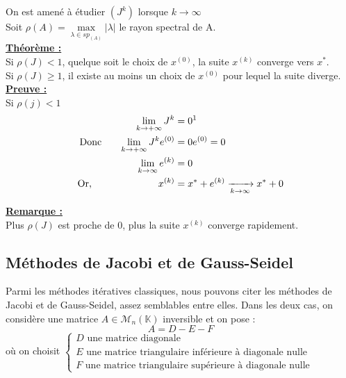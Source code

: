 On est amené à étudier $\left(J^k\right)$ lorsque $k \to \infty$\\

Soit $\rho(A) = \underset{\lambda \in sp_{(A)}}{\max}\left|\lambda\right|$ le rayon spectral de A.\\

\noindent\textbf{\underline{Théorème :}}\\
\indent Si $\rho(J) < 1$, quelque soit le choix de $x^{(0)}$, la suite $x^{(k)}$ converge vers $x^*$.\\
Si $\rho(J) \geq 1$, il existe au moins un choix de $x^{(0)}$ pour lequel la suite diverge.\\

\noindent\textbf{\underline{Preuve :}}\\
\indent Si $\rho(j) < 1$ \\
\begin{align*}
\lim\limits_{k \to +\infty} J^k &= 0 \text{\footnotemark}\\
\text{Donc } \hspace{15pt} \lim\limits_{k \to +\infty} J^ke^{(0)} &= 0e^{(0)} = 0\\
\lim\limits_{k \to \infty} e^{(k)} &= 0\\
\text{Or, } \hspace{65pt} x^{(k)} &= x^* + e^{(k)} \xrightarrow[k\to \infty]{}x^* + 0 
\end{align*}

\noindent\textbf{\underline{Remarque :}}\\
\indent Plus $\rho(J)$ est proche de 0, plus la suite $x^{(k)}$ converge rapidement.\\


\subsection{Méthodes de Jacobi et de Gauss-Seidel}
Parmi les méthodes itératives classiques, nous pouvons citer les méthodes de Jacobi et de Gauss-Seidel, assez semblables entre elles. Dans les deux cas, on considère une matrice $A \in \mathcal{M}_n(\mathbb{K})$ inversible et on pose : $$A = D-E-F$$
où on choisit $\begin{cases}
	D \text{ une matrice diagonale}\\
	E \text{ une matrice triangulaire inférieure à diagonale nulle}\\
	F \text{ une matrice triangulaire supérieure à diagonale nulle}
\end{cases}$\\

